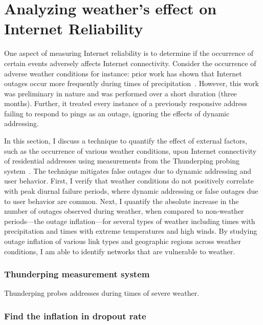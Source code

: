 
\chapter{Analyzing weather's effect on Internet Reliability}
\label{cpt:weather}

One aspect of measuring Internet reliability is to determine if the occurrence of certain events adversely affects Internet connectivity. Consider the occurrence of adverse weather conditions for instance: prior work has shown that Internet outages occur more frequently during times of precipitation~\cite{pingin}. However, this work was preliminary in nature and was performed over a short duration (three months). Further, it treated every instance of a previously responsive address failing to respond to pings as an outage, ignoring the effects of dynamic addressing.

In this section, I discuss a technique to quantify the effect of
external factors, such as the occurrence of various weather
conditions, upon Internet connectivity of residential addresses using
measurements from the Thunderping probing system~\cite{pingin}. The
technique mitigates false outages due to dynamic addressing and user
behavior. First, I verify that weather conditions do not positively
correlate with peak diurnal failure periods, where dynamic addressing
or false outages due to user behavior are common. Next, I quantify
the absolute increase in the number of outages observed during
weather, when compared to non-weather periods---the outage
inflation---for several types of weather including times with
precipitation and times with extreme temperatures and high winds. By
studying outage inflation of various link types and geographic regions
across weather conditions, I am able to identify networks that are
vulnerable to weather.

\subsection{Thunderping measurement system}

Thunderping probes addresses during times of severe weather. 

\subsection{Find the inflation in dropout rate}

